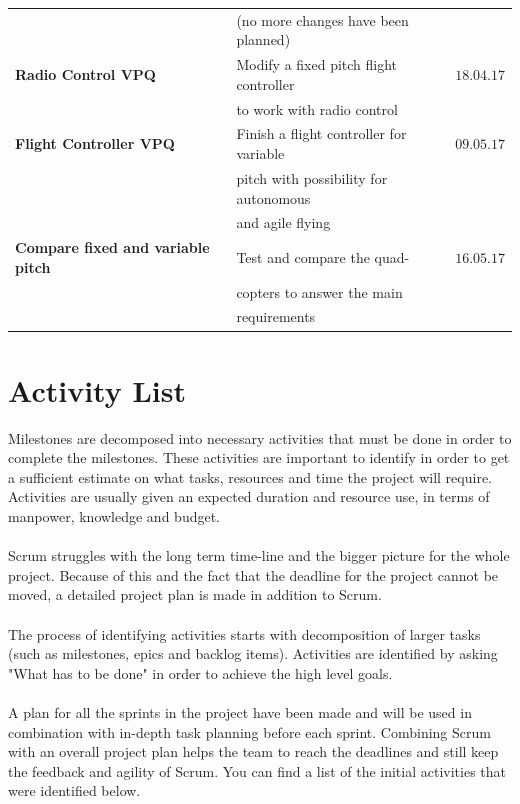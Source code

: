 \begin{table}[H]
\begin{tabular}{llc}
                                    & (no more changes have been planned) & \\\rowcolor{gainsboro}
\textbf{Radio Control VPQ}  & Modify a fixed pitch flight controller & $18.04.17$ \\\rowcolor{gainsboro}
                                & to work with radio control & \\
\textbf{Flight Controller VPQ}  & Finish a flight controller for variable & $09.05.17$ \\
                            & pitch with possibility for autonomous & \\
                            & and agile flying & \\\rowcolor{gainsboro}
\textbf{Compare fixed and variable pitch}  & Test and compare the quad- & $16.05.17$ \\\rowcolor{gainsboro}
                                           & copters to answer the main & \\\rowcolor{gainsboro}
                                           & requirements & 
\end{tabular}                                                               
\end{table}

\section{Activity List}

Milestones are decomposed into necessary activities that must be done in order to complete the milestones. These activities are important to identify in order to get a sufficient estimate on what tasks, resources and time the project will require. Activities are usually given an expected duration and resource use, in terms of manpower, knowledge and budget.\\
\\
Scrum struggles with the long term time-line and the bigger picture for the whole project. Because of this and the fact that the deadline for the project cannot be moved, a detailed project plan is made in addition to Scrum. \\
\\
The process of identifying activities starts with decomposition of larger tasks (such as milestones, epics and backlog items). Activities are identified by asking "What has to be done" in order to achieve the high level goals. \\
\\
A plan for all the sprints in the project have been made and will be used in combination with in-depth task planning before each sprint. Combining Scrum with an overall project plan helps the team to reach the deadlines and still keep the feedback and agility of Scrum. You can find a list of the initial activities that were identified below.\\
\\

